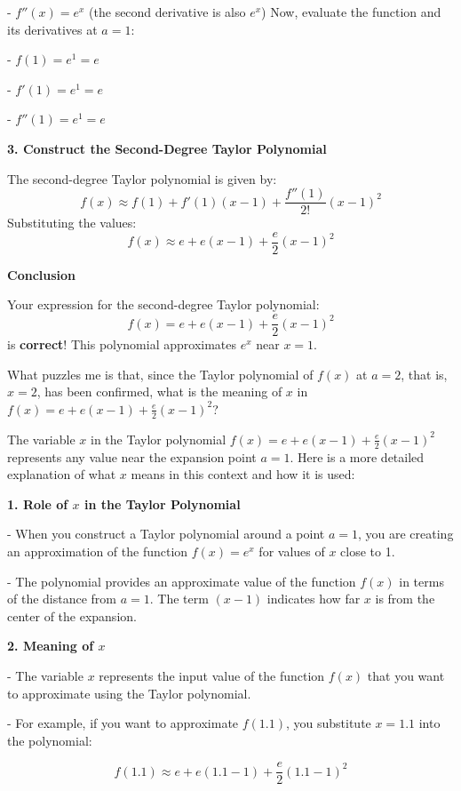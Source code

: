 \documentclass[a4paper,12pt]{book}
\begin{document}
- \( f''(x) = e^x \) (the second derivative is also \( e^x \))
Now, evaluate the function and its derivatives at \( a = 1 \):


- \( f(1) = e^1 = e \)

- \( f'(1) = e^1 = e \)

- \( f''(1) = e^1 = e \)

\textbf{3. Construct the Second-Degree Taylor Polynomial}

The second-degree Taylor polynomial is given by:
\[
f(x) \approx f(1) + f'(1)(x - 1) + \frac{f''(1)}{2!}(x - 1)^2
\]
Substituting the values:
\[
f(x) \approx e + e(x - 1) + \frac{e}{2}(x - 1)^2
\]

\textbf{Conclusion}

Your expression for the second-degree Taylor polynomial:
\[
f(x) = e + e(x - 1) + \frac{e}{2}(x - 1)^2
\]
is \textbf{correct}! This polynomial approximates \( e^x \) near \( x = 1 \).

\begin{bluebox}
What puzzles me is that, since the Taylor polynomial of \(f(x)\) at \(a=2\), that is, \(x=2\), has been confirmed, what is the meaning of \(x\) in \( f(x) = e + e(x-1) + \frac{e}{2} (x-1)^2 \)?
\end{bluebox}

The variable \( x \) in the Taylor polynomial \( f(x) = e + e(x - 1) + \frac{e}{2}(x - 1)^2 \) represents any value near the expansion point \( a = 1 \). Here is a more detailed explanation of what \( x \) means in this context and how it is used:

\textbf{1. Role of \( x \) in the Taylor Polynomial}

- When you construct a Taylor polynomial around a point \( a = 1 \), you are creating an approximation of the function \( f(x) = e^x \) for values of \( x \) close to 1.

- The polynomial provides an approximate value of the function \( f(x) \) in terms of the distance from \( a = 1 \). The term \( (x - 1) \) indicates how far \( x \) is from the center of the expansion.

\textbf{2. Meaning of \( x \)}

- The variable \( x \) represents the input value of the function \( f(x) \) that you want to approximate using the Taylor polynomial.

- For example, if you want to approximate \( f(1.1) \), you substitute \( x = 1.1 \) into the polynomial:  

\[
  f(1.1) \approx e + e(1.1 - 1) + \frac{e}{2}(1.1 - 1)^2
\]
\end{document}
